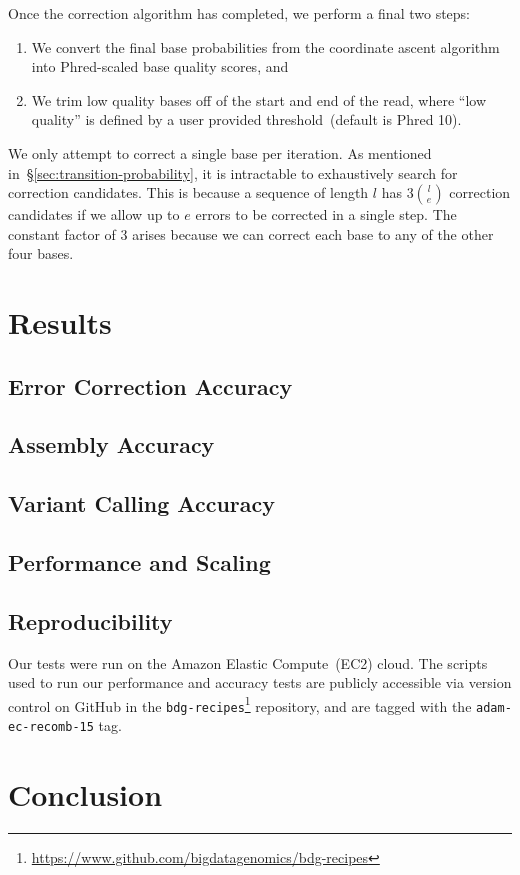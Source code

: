 \documentclass{llncs}
\begin{document}
Once the correction algorithm has completed, we perform a final two steps:

\begin{enumerate}
\item We convert the final base probabilities from the coordinate ascent algorithm into Phred-scaled
base quality scores, and
\item We trim low quality bases off of the start and end of the read, where ``low quality'' is defined by a
user provided threshold~(default is Phred 10).
\end{enumerate}

We only attempt to correct a single base per iteration. As mentioned
in~\S\ref{sec:transition-probability}, it is intractable to exhaustively search for correction candidates.
This is because a sequence of length $l$ has $3 {l \choose e}$ correction candidates if we allow up to
$e$ errors to be corrected in a single step. The constant factor of 3 arises because we can correct each 
base to any of the other four bases.

\section{Results}
\label{sec:results}

\subsection{Error Correction Accuracy}
\label{sec:accuracy}

\subsection{Assembly Accuracy}
\label{sec:assembly}

\subsection{Variant Calling Accuracy}
\label{sec:variant-calling}

\subsection{Performance and Scaling}
\label{sec:performance}

\subsection{Reproducibility}
\label{sec:reproducibility}

Our tests were run on the Amazon Elastic Compute~(EC2) cloud. The scripts used to run our performance
and accuracy tests are publicly accessible via version control on GitHub in the
\texttt{bdg-recipes}\footnote{\url{https://www.github.com/bigdatagenomics/bdg-recipes}} repository, and
are tagged with the \texttt{adam-ec-recomb-15} tag.

\section{Conclusion}
\label{sec:conclusion}



\end{document}
